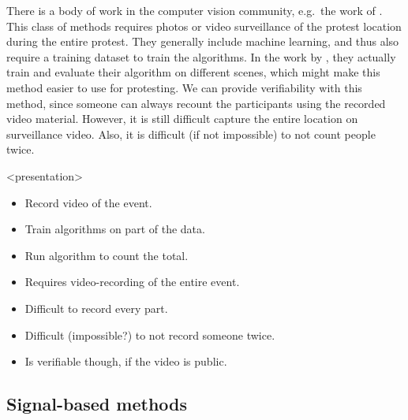 There is a body of work in the computer vision community, e.g.\ the work of 
\textcite{NNCrowdCounting}.
This class of methods requires photos or video surveillance of the protest 
location during the entire protest.
They generally include machine learning, and thus also require a training 
dataset to train the algorithms.
In the work by \textcite{NNCrowdCounting}, they actually train and evaluate 
their algorithm on different scenes, which might make this method easier to use 
for protesting.
We can provide verifiability with this method, since someone can always recount
the participants using the recorded video material.
However, it is still difficult capture the entire location on surveillance 
video.
Also, it is difficult (if not impossible) to not count people twice.

\begin{frame}<presentation>
  \begin{solution}
    \begin{itemize}
      \item Record video of the event.
      \item Train algorithms on part of the data.
      \item Run algorithm to count the total.
    \end{itemize}
  \end{solution}

  \pause

  \begin{remark}
    \begin{itemize}
      \item Requires video-recording of the entire event.
      \item Difficult to record every part.
      \item Difficult (impossible?) to not record someone twice.
      \item Is verifiable though, if the video is public.
    \end{itemize}
  \end{remark}
\end{frame}

\subsection<presentation>{Signal-based methods}

